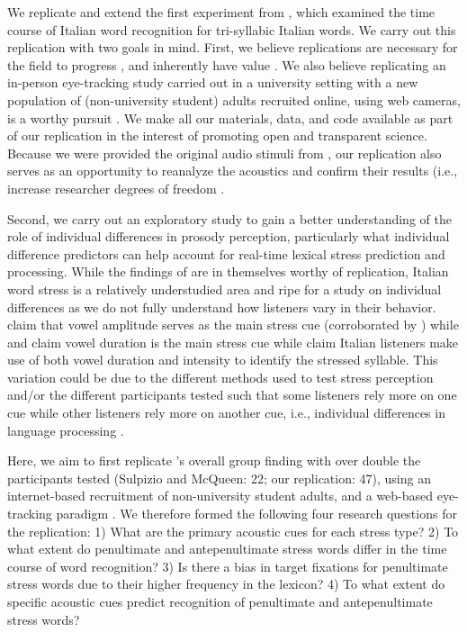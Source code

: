 We replicate and extend the first experiment from \cite{Sulpizio_McQueen_2012}, which examined the time course of Italian word recognition for tri-syllabic Italian words. We carry out this replication with two goals in mind. First, we believe replications are necessary for the field to progress \citep{Rakosi2017}, and inherently have value \citep{Kobrock2023}. We also believe replicating an in-person eye-tracking study carried out in a university setting with a new population of (non-university student) adults recruited online, using web cameras, is a worthy pursuit \citep{Prystauka_Altmann_Rothman_2023}. We make all our materials, data, and code available as part of our replication in the interest of promoting open and transparent science. Because we were provided the original audio stimuli from \cite{Sulpizio_McQueen_2012}, our replication also serves as an opportunity to reanalyze the acoustics and confirm their results (i.e., increase researcher degrees of freedom \cite{Corretta2023}.

Second, we carry out an exploratory study to gain a better understanding of the role of individual differences in prosody perception, particularly what individual difference predictors can help account for real-time lexical stress prediction and processing. While the findings of \cite{Sulpizio_McQueen_2012} are in themselves worthy of replication, Italian word stress is a relatively understudied area and ripe for a study on individual differences as we do not fully understand how listeners vary in their behavior.  \cite{Maturi1998} claim that vowel amplitude serves as the main stress cue (corroborated by \cite{Sulpizio_McQueen_2012}) while \cite{Alfano2006} and \cite{Alfano2009} claim vowel duration is the main stress cue while \cite{Tagliapietra2005} claim Italian listeners make use of both vowel duration and intensity to identify the stressed syllable. This variation could be due to the different methods used to test stress perception and/or the different participants tested such that some listeners rely more on one cue while other listeners rely more on another cue, i.e., individual differences in language processing \citep{Yu2019, Kidd2018}.

Here, we aim to first replicate \cite{Sulpizio_McQueen_2012}'s overall group finding with over double the participants tested (Sulpizio and McQueen: 22; our replication: 47), using an internet-based recruitment of non-university student adults, and a web-based eye-tracking paradigm \citep{Vos_2017}. We therefore formed the following four research questions for the replication: 1) What are the primary acoustic cues for each stress type? 2) To what extent do penultimate and antepenultimate stress words differ in the time course of word recognition? 3) Is there a bias in target fixations for penultimate stress words due to their higher frequency in the lexicon? 4) To what extent do specific acoustic cues predict recognition of penultimate and antepenultimate stress words? 

